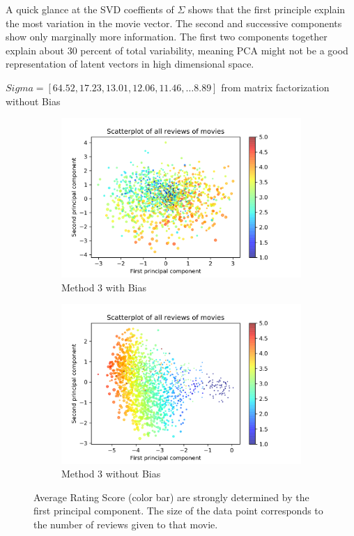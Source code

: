 A quick glance at the SVD coeffients of $\Sigma$ shows that the first principle explain the most variation in the movie vector. The second and successive components show only marginally more information. The first two components together explain about 30 percent of total variability, meaning PCA might not be a good representation of latent vectors in high dimensional space.

$Sigma = [64.52, 17.23, 13.01, 12.06, 11.46, \dots 8.89]$ from matrix factorization without Bias

\begin{figure}[H]
	\centering
	\begin{subfigure}[t]{0.4\textwidth}
		\includegraphics[width=\textwidth]{ScoresBias.png}
		\caption{Method 3 with Bias}
	\end{subfigure}
	\begin{subfigure}[t]{0.4\textwidth}
		\includegraphics[width=\textwidth]{ScoresRaw.png}
		\caption{Method 3 without Bias}
	\end{subfigure}
	\caption{Average Rating Score (color bar) are strongly determined by the first principal component. The size of the data point corresponds to the number of reviews given to that movie.}
\end{figure}

